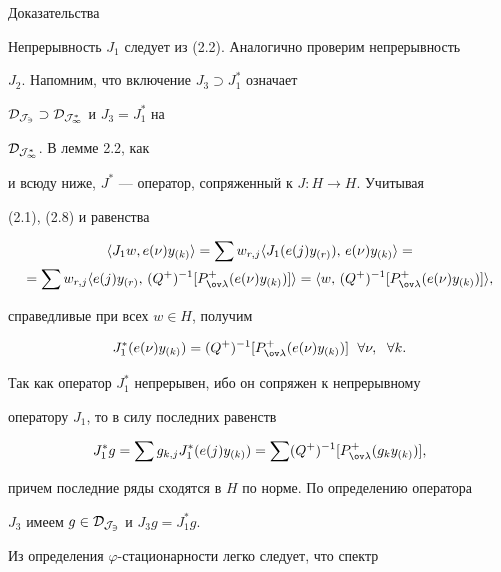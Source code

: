 \begin{pf*}{Доказательства} 


Непрерывность $J_1$ следует из (2.2). Аналогично проверим непрерывность 


$J_2$. Напомним, что включение $J_3\supset J^*_1$ означает 


$\cal D_{J_3}\supset\cal D_{J^*_1}$ и $J_3=J^*_1$ на 


$\cal D_{J^*_1}$. В лемме 2.2, как 


и всюду ниже, $J^*$ --- оператор, сопряженный к $J:H\to H$. Учитывая 


(2.1), (2.8) и равенства 


\begin{multline*} 


\la J_1w,e(\nu)y_{(k)}\ra=\sum w_{r,j}\la J_1(e(j)y_{(r)}),\, 


e(\nu)y_{(k)}\ra=\\ 


=\sum w_{r,j}\la e(j)y_{(r)},\,(Q^+)^{-1} 


[P^+_{\ov\lambda}(e(\nu)y_{(k)})]\ra= 


\la w,\,(Q^+)^{-1}[P^+_{\ov\lambda}(e(\nu)y_{(k)})]\ra, 


\end{multline*} 


справедливые при всех $w\in H$, получим 


$$ 


J^*_1(e(\nu)y_{(k)})=(Q^+)^{-1}[P^+_{\ov\lambda} 


(e(\nu)y_{(k)})]\ \;\forall\nu,\ \;\forall k. 


$$ 


Так как оператор $J^*_1$ непрерывен, ибо он сопряжен к непрерывному 


оператору $J_1$, то в силу последних равенств 


$$ 


J^*_1g=\sum g_{k,j}J^*_1(e(j)y_{(k)})= 


\sum (Q^+)^{-1}[P^+_{\ov\lambda}(g_k y_{(k)})], 


$$ 


причем последние ряды сходятся в $H$ по норме. По определению оператора 


$J_3$ имеем $g\in\cal D_{J_3}$ и $J_3g=J^*_1g$. 


\end{pf*} 


 


Из определения $\varphi$-стационарности легко следует, что спектр 



